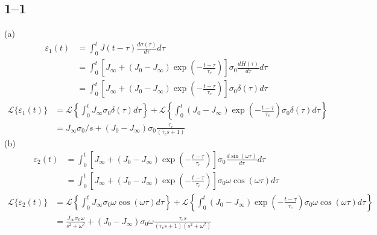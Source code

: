 \subsection*{1--1}
(a) 
\begin{align*}
\varepsilon_1(t) &= \int_0^t J(t-\tau) \frac{d\sigma(\tau)}{d\tau} d\tau \\
&= \int_0^t [J_\infty + (J_0-J_\infty)\exp(-\frac{t-\tau}{\tau_c})]\sigma_{0}\frac{dH(\tau)}{d\tau}d\tau \\
&= \int_0^t [J_\infty + (J_0-J_\infty)\exp(-\frac{t-\tau}{\tau_c})]\sigma_{0}\delta(\tau)
d\tau
\end{align*}
\begin{align*}
    \mathcal{L}\{\varepsilon_1(t)\} &= \mathcal{L}\left\{\int_0^t J_\infty \sigma_0 \delta(\tau)d\tau\right\} + \mathcal{L}\left\{ \int_0^t(J_0-J_\infty)\exp(-\frac{t-\tau}{\tau_c}) \sigma_{0} \delta(\tau) d\tau\right\} \\
    &= J_\infty \sigma_0 /s + (J_0-J_\infty)\sigma_0\frac{\tau_c}{(\tau_cs+1)}
\end{align*}
(b)
\begin{align*}
    \varepsilon_2(t) 
&= \int_0^t [J_\infty + (J_0-J_\infty)\exp(-\frac{t-\tau}{\tau_c})]\sigma_{0}\frac{d\sin({\omega \tau})}{d\tau}d\tau \\
&= \int_0^t [J_\infty + (J_0-J_\infty)\exp(-\frac{t-\tau}{\tau_c})]\sigma_{0}\omega\cos({\omega \tau})d\tau
\end{align*}
\begin{align*}
    \mathcal{L}\{\varepsilon_2(t)\} &= \mathcal{L}\left\{\int_0^t J_\infty \sigma_0\omega \cos({\omega \tau})d\tau\right\} + \mathcal{L}\left\{ \int_0^t(J_0-J_\infty)\exp(-\frac{t-\tau}{\tau_c}) \sigma_{0}\omega \cos({\omega \tau}) d\tau\right\} \\
    &= \frac{J_\infty \sigma_0\omega}{s^2 + \omega^2}  + (J_0-J_\infty)\sigma_0\omega\frac{\tau_cs}{(\tau_cs+1)(s^2+\omega^2)}
\end{align*}

